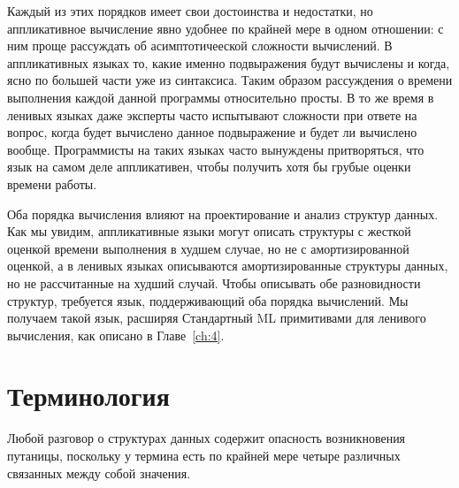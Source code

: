 Каждый из этих порядков имеет свои достоинства и недостатки, но
аппликативное вычисление явно удобнее по крайней мере в одном
отношении: с ним проще рассуждать об асимптотичееской сложности
вычислений.  В аппликативных языках то, какие именно подвыражения
будут вычислены и когда, ясно по большей части уже из синтаксиса.
Таким образом рассуждения о времени выполнения каждой данной программы
относительно просты.  В то же время в ленивых языках даже эксперты
часто испытывают сложности при ответе на вопрос, когда будет вычислено
данное подвыражение и будет ли вычислено вообще.  Программисты на
таких языках часто вынуждены притворяться, что язык на самом деле
аппликативен, чтобы получить хотя бы грубые оценки времени работы.

Оба порядка вычисления влияют на проектирование и анализ структур
данных. Как мы увидим, аппликативные языки могут описать структуры с
жесткой оценкой времени выполнения в худшем случае, но не с амортизированной
оценкой, а в ленивых языках описываются амортизированные структуры
данных, но не рассчитанные на худший случай. Чтобы описывать обе
разновидности структур, требуется язык, поддерживающий оба
порядка вычислений. Мы получаем такой язык, расширяя Стандартный ML
примитивами для ленивого вычисления, как описано в Главе~\ref{ch:4}.

\section{Терминология}

Любой разговор о структурах данных содержит опасность возникновения путаницы,
поскольку у термина  есть по
крайней мере четыре различных связанных между собой значения.

